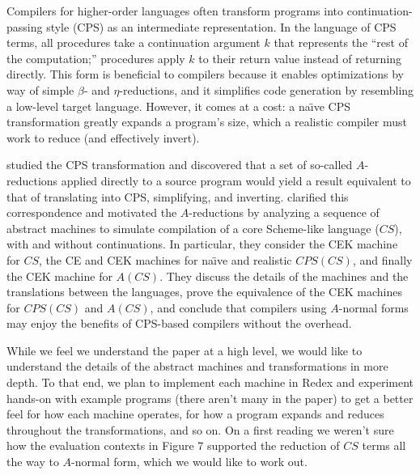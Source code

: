 \documentclass[11pt]{article}
\begin{document}
\thispagestyle{fancy}

Compilers for higher-order languages often transform programs into
continuation-passing style (CPS) as an intermediate representation. In the
language of CPS terms, all procedures take a continuation argument $k$
that represents the ``rest of the computation;'' procedures apply $k$ to their
return value instead of returning directly. This form is beneficial to
compilers because it enables optimizations by way of simple $\beta$- and
$\eta$-reductions, and it simplifies code generation by resembling a low-level
target language. However, it comes at a cost: a na\"{\i}ve CPS transformation
greatly expands a program's size, which a realistic compiler must work to
reduce (and effectively invert).

\citet{Sabry:1992zr} studied the CPS transformation and discovered that a set
of so-called $A$-reductions applied directly to a source program would yield
a result equivalent  to that of translating into CPS, simplifying,
and inverting. \citet{Flanagan:1993fk} clarified this correspondence and
motivated the $A$-reductions by analyzing a sequence of abstract machines to
simulate compilation of a core Scheme-like language ($\mathit{CS}$), with and
without continuations. In particular, they consider the CEK machine for
$\mathit{CS}$, the CE and CEK machines for na\"{\i}ve and realistic
$\mathit{CPS}(\mathit{CS})$, and finally the CEK machine for $A(\mathit{CS})$.
They discuss the details of the machines and the translations between the
languages, prove the equivalence of the CEK machines for
$\mathit{CPS}(\mathit{CS})$ and $A(\mathit{CS})$, and conclude that compilers
using $A$-normal forms may enjoy the benefits of CPS-based compilers without
the overhead.

While we feel we understand the paper at a high level, we would like to
understand the details of the abstract machines and transformations in
more depth. To that end, we plan to implement each machine in Redex and
experiment hands-on with example programs (there aren't many in the paper)
to get a better feel for how each machine operates, for how a program
expands and reduces throughout the transformations, and so on. On a first
reading we weren't sure how the evaluation contexts in Figure 7 supported the
reduction of $\mathit{CS}$ terms all the way to $A$-normal form, which we
would like to work out.





\end{document}
